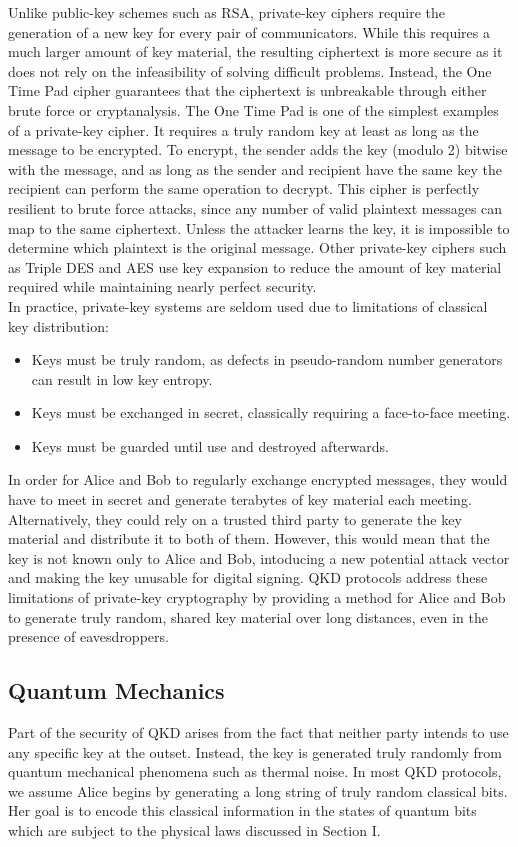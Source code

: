 \documentclass[conference]{IEEEtran}
\begin{document}
Unlike public-key schemes such as RSA, private-key ciphers require the generation of a new key for every pair of communicators. While this requires a much larger amount of key material, the resulting ciphertext is more secure as it does not rely on the infeasibility of solving difficult problems. Instead, the One Time Pad cipher guarantees that the ciphertext is unbreakable through either brute force or cryptanalysis. The One Time Pad is one of the simplest examples of a private-key cipher. It requires a truly random key at least as long as the message to be encrypted. To encrypt, the sender adds the key (modulo 2) bitwise with the message, and as long as the sender and recipient have the same key the recipient can perform the same operation to decrypt. This cipher is perfectly resilient to brute force attacks, since any number of valid plaintext messages can map to the same ciphertext. Unless the attacker learns the key, it is impossible to determine which plaintext is the original message. Other private-key ciphers such as Triple DES and AES use key expansion to reduce the amount of key material required while maintaining nearly perfect security.\\

In practice, private-key systems are seldom used due to limitations of classical key distribution:
\begin{itemize}
\item Keys must be truly random, as defects in pseudo-random number generators can result in low key entropy\cite{Heninger}.
\item Keys must be exchanged in secret, classically requiring a face-to-face meeting.
\item Keys must be guarded until use and destroyed afterwards.
\end{itemize}
In order for Alice and Bob to regularly exchange encrypted messages, they would have to meet in secret and generate terabytes of key material each meeting. Alternatively, they could rely on a trusted third party to generate the key material and distribute it to both of them. However, this would mean that the key is not known only to Alice and Bob, intoducing a new potential attack vector and making the key unusable for digital signing. QKD protocols address these limitations of private-key cryptography by providing a method for Alice and Bob to generate truly random, shared key material over long distances, even in the presence of eavesdroppers.\\

\subsection{Quantum Mechanics}
Part of the security of QKD arises from the fact that neither party intends to use any specific key at the outset. Instead, the key is generated truly randomly from quantum mechanical phenomena such as thermal noise\cite{Jun}. In most QKD protocols, we assume Alice begins by generating a long string of truly random classical bits. Her goal is to encode this classical information in the states of quantum bits which are subject to the physical laws discussed in Section I.\\
\end{document}
